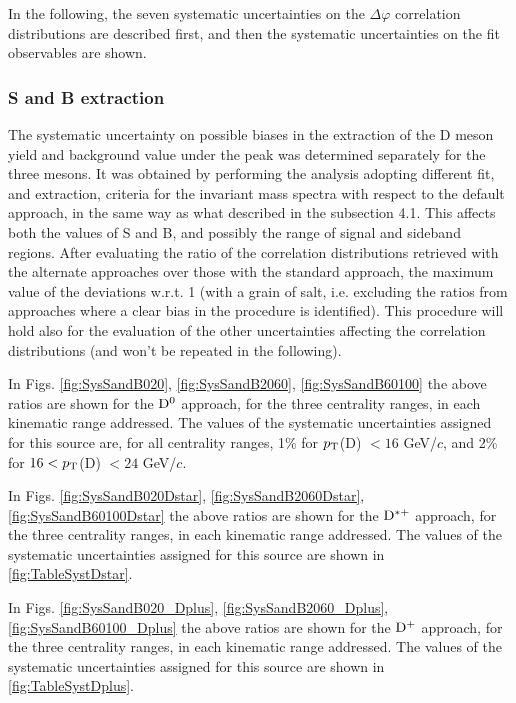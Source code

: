 In the following, the seven systematic uncertainties on the $\Delta\varphi$ correlation distributions are described first, and then the systematic uncertainties on the fit observables are shown.

\subsubsection{S and B extraction}
The systematic uncertainty on possible biases in the extraction of the D meson yield and background value under the peak was determined separately for the three mesons. It was obtained by performing the analysis adopting different fit, and extraction, criteria for the invariant mass spectra with respect to the default approach, in the same way as what described in the subsection 4.1. This affects both the values of S and B, and possibly the range of signal and sideband regions.
After evaluating the ratio of the correlation distributions retrieved with the alternate approaches over those with the standard approach, the maximum value of the deviations w.r.t. 1 (with a grain of salt, i.e. excluding the ratios from approaches where a clear bias in the procedure is identified).
This procedure will hold also for the evaluation of the other uncertainties affecting the correlation distributions (and won't be repeated in the following).

In Figs. \ref{fig:SysSandB020}, \ref{fig:SysSandB2060}, \ref{fig:SysSandB60100} the above ratios are shown for the ${\rm D^0}$ approach, for the three centrality ranges, in each kinematic range addressed. The values of the systematic uncertainties assigned for this source are, for all centrality ranges, 1\% for $p_{\rm T}$(D) $< 16$ GeV/$c$, and 2\% for $16 < p_{\rm T}$(D) $< 24$ GeV/$c$.

In Figs. \ref{fig:SysSandB020Dstar}, \ref{fig:SysSandB2060Dstar}, \ref{fig:SysSandB60100Dstar} the above ratios are shown for the ${\rm D^{*+}}$ approach, for the three centrality ranges, in each kinematic range addressed. The values of the systematic uncertainties assigned for this source are shown in \ref{fig:TableSystDstar}.

In Figs. \ref{fig:SysSandB020_Dplus}, \ref{fig:SysSandB2060_Dplus}, \ref{fig:SysSandB60100_Dplus} the above ratios are shown for the ${\rm D^+}$ approach, for the three centrality ranges, in each kinematic range addressed. The values of the systematic uncertainties assigned for this source are shown in \ref{fig:TableSystDplus}.

